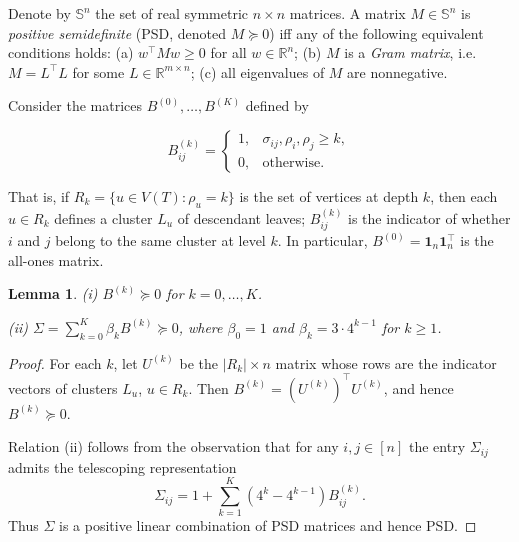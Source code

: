\documentclass{article}
\newtheorem{lemma}{Lemma}
\begin{document}
Denote by $\mathbb{S}^n$ the set of real symmetric $n\times n$
matrices. A matrix $M\in\mathbb{S}^n$ is {\it positive semidefinite}
(PSD, denoted $M\succeq0$) iff any of the following equivalent
conditions holds: (a) $w^{\top}Mw\ge0$ for all
$w\in\mathbb{R}^n$; (b) $M$ is a {\it Gram matrix},
i.e. $M=L^{\top}L$ for some $L\in\mathbb{R}^{m\times n}$;
(c) all eigenvalues of $M$ are nonnegative.

Consider the matrices $B^{(0)},\dots,B^{(K)}$ defined by

\begin{equation}
B^{(k)}_{ij} =
\begin{cases}
1, & \sigma_{ij},\rho_i,\rho_j \ge k, \\
0, & \text{otherwise}.
\end{cases}
\end{equation}

That is, if $R_k=\{u\in V(T):\rho_u=k\}$ is the set of vertices
at depth $k$, then each $u\in R_k$ defines a cluster $L_u$ of
descendant leaves; $B^{(k)}_{ij}$ is the indicator of whether
$i$ and $j$ belong to the same cluster at level $k$. In particular,
$B^{(0)}=\mathbf{1}_n\mathbf{1}_n^{\top}$ is the all-ones matrix.


\begin{lemma}\label{lem:PSD}
(i) $B^{(k)}\succeq0$ for $k=0,\dots,K$.

(ii) $\Sigma=\sum_{k=0}^K \beta_k B^{(k)}\succeq0$, where
$\beta_0=1$ and $\beta_k=3\cdot4^{k-1}$ for $k\ge1$.
\end{lemma}

\begin{proof}
    
For each $k$, let $U^{(k)}$ be the $|R_k|\times n$ matrix whose
rows are the indicator vectors of clusters $L_u$, $u\in R_k$.
Then $B^{(k)}=(U^{(k)})^{\top}U^{(k)}$, and hence $B^{(k)}\succeq0$.
    
 Relation (ii) follows from the observation that for any
$i,j\in[n]$ the entry $\Sigma_{ij}$ admits the telescoping
representation
\begin{equation}\label{eq:PSDU}
\Sigma_{ij}=1+\sum_{k=1}^{K}(4^k-4^{k-1})B_{ij}^{(k)}.
\end{equation}
Thus $\Sigma$ is a positive linear combination of PSD
matrices and hence PSD.
\end{proof}
\end{document}
